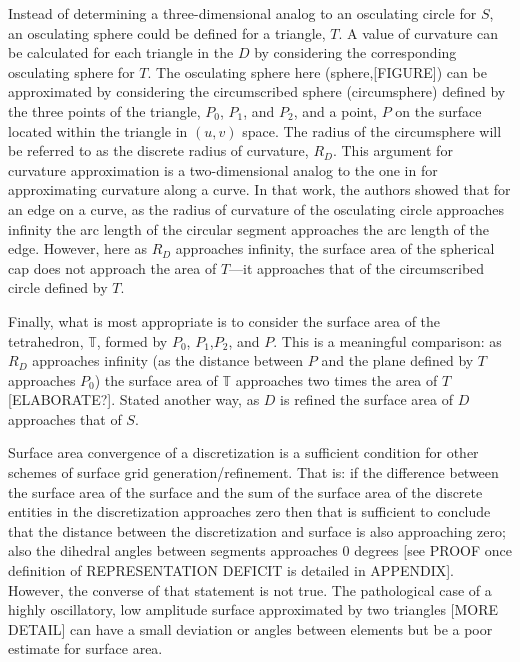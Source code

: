 Instead of determining a three-dimensional analog to an osculating
circle for $S$, an osculating sphere could be defined for a triangle,
$T$. A value of curvature can be calculated for each triangle in the $D$
by considering the corresponding osculating sphere for $T$. The
osculating sphere here (sphere,[FIGURE]) can be approximated by
considering the circumscribed sphere (circumsphere) \cite{casey1888}
defined by the three points of the triangle, $P_0$, $P_1$, and $P_2$,
and a point, $P$ on the surface located within the triangle in $(u,v)$
space. The radius of the circumsphere will be referred to as the
discrete radius of curvature, $R_D$. This argument for curvature
approximation is a two-dimensional analog to the one in
\cite{mclaurin12} for approximating curvature along a curve. In that
work, the authors showed that for an edge on a curve, as the radius of
curvature of the osculating circle approaches infinity the arc length of
the circular segment approaches the arc length of the edge. However,
here as $R_D$ approaches infinity, the surface area of the spherical cap
does not approach the area of $T$---it approaches that of the
circumscribed circle defined by $T$.

Finally, what is most appropriate is to consider the surface area of the
tetrahedron, ${\mathbb T}$, formed by $P_0$, $P_1$,$P_2$, and $P$. This
is a meaningful comparison: as $R_D$ approaches infinity (as the
distance between $P$ and the plane defined by $T$ approaches $P_0$) the
surface area of ${\mathbb T}$ approaches two times the area of
$T$[ELABORATE?].  Stated another way, as $D$ is refined the surface area
of $D$ approaches that of $S$.

Surface area convergence of a discretization is a sufficient condition
for other schemes of surface grid generation/refinement. That is: if the
difference between the surface area of the surface and the sum of the
surface area of the discrete entities in the discretization approaches
zero then that is sufficient to conclude that the distance between the
discretization and surface is also approaching zero; also the dihedral
angles between segments approaches $0$ degrees [see PROOF once
definition of REPRESENTATION DEFICIT is detailed in APPENDIX]. However,
the converse of that statement is not true. The pathological case of a
highly oscillatory, low amplitude surface approximated by two triangles
[MORE DETAIL] can have a small deviation or angles between elements
but be a poor estimate for surface area.

